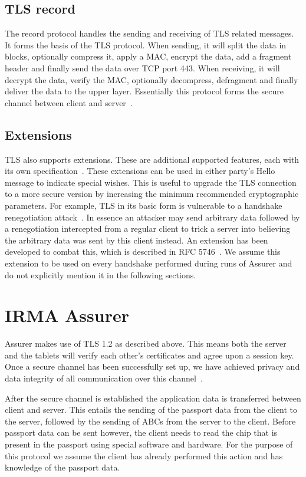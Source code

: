 \subsection{TLS record}
The record protocol handles the sending and receiving of TLS related messages. It forms the basis of the TLS protocol. When sending, it will split the data in blocks, optionally compress it, apply a MAC, encrypt the data, add a fragment header and finally send the data over TCP port 443. When receiving, it will decrypt the data, verify the MAC, optionally decompress, defragment and finally deliver the data to the upper layer. Essentially this protocol forms the secure channel between client and server~\cite{tls1.2}.

\subsection{Extensions}
TLS also supports extensions. These are additional supported features, each with its own specification~\cite{tlsext}. These extensions can be used in either party's Hello message to indicate special wishes. This is useful to upgrade the TLS connection to a more secure version by increasing the minimum recommended cryptographic parameters. For example, TLS in its basic form is vulnerable to a handshake renegotiation attack~\cite{lecture}. In essence an attacker may send arbitrary data followed by a renegotiation intercepted from a regular client to trick a server into believing the arbitrary data was sent by this client instead. An extension has been developed to combat this, which is described in RFC 5746~\cite{tls_handshake_vuln}. We assume this extension to be used on every handshake performed during runs of Assurer and do not explicitly mention it in the following sections.

\section{IRMA Assurer}
Assurer makes use of TLS 1.2 as described above. This means both the server and the tablets will verify each other's certificates and agree upon a session key. Once a secure channel has been successfully set up, we have achieved privacy and data integrity of all communication over this channel~\cite{tls1.2}.

After the secure channel is established the application data is transferred between client and server. This entails the sending of the passport data from the client to the server, followed by the sending of ABCs from the server to the client. Before passport data can be sent however, the client needs to read the chip that is present in the passport using special software and hardware. For the purpose of this protocol we assume the client has already performed this action and has knowledge of the passport data.

